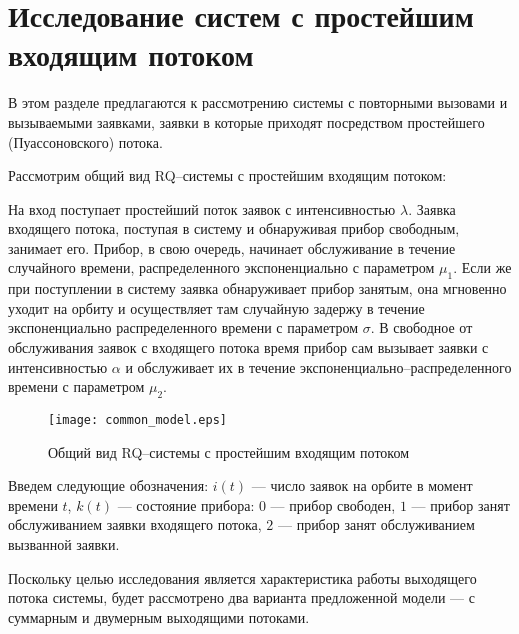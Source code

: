 \section {Исследование систем с простейшим входящим потоком}
В этом разделе предлагаются к рассмотрению системы с повторными вызовами и вызываемыми заявками, заявки в которые приходят посредством простейшего (Пуассоновского) потока.

Рассмотрим общий вид RQ--системы с простейшим входящим потоком:

 На вход поступает простейший поток заявок с интенсивностью $\lambda$. Заявка входящего потока, поступая в систему и обнаруживая прибор свободным, занимает его. Прибор, в свою очередь, начинает обслуживание в течение случайного времени, распределенного экспоненциально с параметром $\mu_{1}$. Если же при поступлении в систему заявка обнаруживает прибор занятым, она мгновенно уходит на орбиту и осуществляет там случайную задержу в течение экспоненциально распределенного времени с параметром $\sigma$. В свободное от обслуживания заявок с входящего потока время прибор сам вызывает заявки с интенсивностью $\alpha$ и обслуживает их в течение экспоненциально--распределенного времени с параметром $\mu_{2}$.
\begin{figure}[H]
	\centering
	\texttt{[image: common\_model.eps]}
	\caption{Общий вид RQ--системы с простейшим входящим потоком}
	\label{common_model_fig}
\end{figure}
Введем следующие обозначения: $i(t)$ --- число заявок на орбите в момент времени $t$, $k(t)$ --- состояние прибора: $0$ --- прибор свободен, $1$ --- прибор занят обслуживанием заявки входящего потока, $2$ --- прибор занят обслуживанием вызванной заявки. 
 
Поскольку целью исследования является характеристика работы выходящего потока системы, будет рассмотрено два варианта предложенной модели --- с суммарным и двумерным выходящими потоками.


